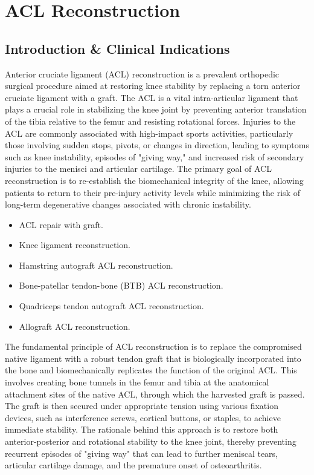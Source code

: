 \chapter{ACL Reconstruction}

\section*{Introduction \& Clinical Indications}
Anterior cruciate ligament (ACL) reconstruction is a prevalent orthopedic surgical procedure aimed at restoring knee stability by replacing a torn anterior cruciate ligament with a graft. The ACL is a vital intra-articular ligament that plays a crucial role in stabilizing the knee joint by preventing anterior translation of the tibia relative to the femur and resisting rotational forces. Injuries to the ACL are commonly associated with high-impact sports activities, particularly those involving sudden stops, pivots, or changes in direction, leading to symptoms such as knee instability, episodes of "giving way," and increased risk of secondary injuries to the menisci and articular cartilage. The primary goal of ACL reconstruction is to re-establish the biomechanical integrity of the knee, allowing patients to return to their pre-injury activity levels while minimizing the risk of long-term degenerative changes associated with chronic instability.

\begin{itemize}
  \item ACL repair with graft.
  \item Knee ligament reconstruction.
  \item Hamstring autograft ACL reconstruction.
  \item Bone-patellar tendon-bone (BTB) ACL reconstruction.
  \item Quadriceps tendon autograft ACL reconstruction.
  \item Allograft ACL reconstruction.
\end{itemize}

The fundamental principle of ACL reconstruction is to replace the compromised native ligament with a robust tendon graft that is biologically incorporated into the bone and biomechanically replicates the function of the original ACL. This involves creating bone tunnels in the femur and tibia at the anatomical attachment sites of the native ACL, through which the harvested graft is passed. The graft is then secured under appropriate tension using various fixation devices, such as interference screws, cortical buttons, or staples, to achieve immediate stability. The rationale behind this approach is to restore both anterior-posterior and rotational stability to the knee joint, thereby preventing recurrent episodes of "giving way" that can lead to further meniscal tears, articular cartilage damage, and the premature onset of osteoarthritis.

